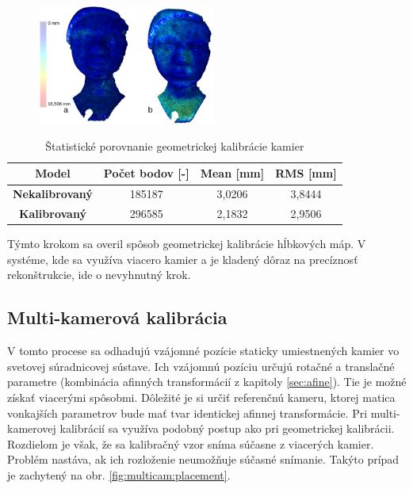 \begin{figure}[H]
	\centering
	\includegraphics[width=0.52\textwidth]{figures/calibration_hausdorff_single.jpg}
	\caption{}
	\label{fig:calib:haus:single}
\end{figure}



\begin{table}[h]
	\caption{\label{tab:calib:single} Štatistické porovnanie geometrickej kalibrácie kamier }
	\centering
	\begin{tabular}{cccc}
		\toprule
		\textbf{Model} & \textbf{Počet bodov [-]} & \textbf{Mean [mm]} & \textbf{RMS [mm]} \\ 
		\midrule
		\textbf{Nekalibrovaný} & 185187 & 3,0206	& 3,8444 \\
		\textbf{Kalibrovaný} & 296585   & 2,1832   & 2,9506  \\  
		\bottomrule
	\end{tabular}
\end{table}

Týmto krokom sa overil spôsob geometrickej kalibrácie hĺbkových máp. V systéme, kde sa využíva viacero kamier a je kladený dôraz na precíznosť rekonštrukcie, ide o nevyhnutný krok. 


\subsection{Multi-kamerová kalibrácia}

V tomto procese sa odhadujú vzájomné pozície staticky umiestnených kamier vo svetovej súradnicovej sústave. Ich vzájomnú pozíciu určujú rotačné a translačné parametre (kombinácia afinných transformácií z kapitoly \ref{sec:afine}). Tie je možné získať viacerými spôsobmi. Dôležité je si určiť referenčnú kameru, ktorej matica vonkajších parametrov bude mať tvar identickej afinnej transformácie. Pri multi-kamerovej kalibrácií sa využíva podobný postup ako pri geometrickej kalibrácii. Rozdielom je však, že sa kalibračný vzor sníma súčasne z viacerých kamier. Problém nastáva, ak ich rozloženie neumožňuje súčasné snímanie. Takýto prípad je zachytený na obr. \ref{fig:multicam:placement}.

